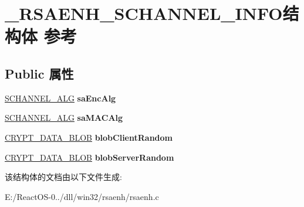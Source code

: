 \hypertarget{struct___r_s_a_e_n_h___s_c_h_a_n_n_e_l___i_n_f_o}{}\section{\+\_\+\+R\+S\+A\+E\+N\+H\+\_\+\+S\+C\+H\+A\+N\+N\+E\+L\+\_\+\+I\+N\+F\+O结构体 参考}
\label{struct___r_s_a_e_n_h___s_c_h_a_n_n_e_l___i_n_f_o}
\subsection*{Public 属性}
\begin{DoxyCompactItemize}
\item 
\mbox{\label{struct___r_s_a_e_n_h___s_c_h_a_n_n_e_l___i_n_f_o_ab6b636b02f7c9318b306747cdd52d85b}} 
\hyperlink{struct___s_c_h_a_n_n_e_l___a_l_g}{S\+C\+H\+A\+N\+N\+E\+L\+\_\+\+A\+LG} {\bfseries sa\+Enc\+Alg}
\item 
\mbox{\label{struct___r_s_a_e_n_h___s_c_h_a_n_n_e_l___i_n_f_o_a0d6cb8bf817c3b82835fa0bc3b297f42}} 
\hyperlink{struct___s_c_h_a_n_n_e_l___a_l_g}{S\+C\+H\+A\+N\+N\+E\+L\+\_\+\+A\+LG} {\bfseries sa\+M\+A\+C\+Alg}
\item 
\mbox{\label{struct___r_s_a_e_n_h___s_c_h_a_n_n_e_l___i_n_f_o_a9f8f01e15cd9130beef89c2d2d7cdec4}} 
\hyperlink{struct___c_r_y_p_t_o_a_p_i___b_l_o_b}{C\+R\+Y\+P\+T\+\_\+\+D\+A\+T\+A\+\_\+\+B\+L\+OB} {\bfseries blob\+Client\+Random}
\item 
\mbox{\label{struct___r_s_a_e_n_h___s_c_h_a_n_n_e_l___i_n_f_o_a66b50916a02fd8d60b0db1f605b52fea}} 
\hyperlink{struct___c_r_y_p_t_o_a_p_i___b_l_o_b}{C\+R\+Y\+P\+T\+\_\+\+D\+A\+T\+A\+\_\+\+B\+L\+OB} {\bfseries blob\+Server\+Random}
\end{DoxyCompactItemize}


该结构体的文档由以下文件生成\+:\begin{DoxyCompactItemize}
\item 
E\+:/\+React\+O\+S-\/0../dll/win32/rsaenh/rsaenh.\+c\end{DoxyCompactItemize}
